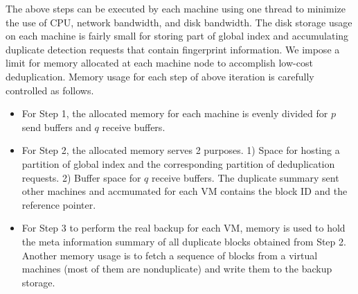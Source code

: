 The above steps can be executed by each machine
using one thread to minimize the use of CPU, network bandwidth, and disk bandwidth.
The  disk storage usage on each machine 
is fairly small for  storing part of global index and
accumulating  duplicate detection requests that contain fingerprint information.   
We impose a limit for memory allocated at each machine node to accomplish low-cost deduplication.  
Memory usage for each step of above iteration is carefully controlled as follows.
\begin{itemize}
\item For Step 1, the allocated memory for each machine is evenly divided for $p$ send buffers and $q$ receive buffers.

\item 
For Step 2,  the allocated memory serves 2 purposes. 1) Space for hosting a partition of global index and 
the corresponding partition of  deduplication requests. 2) Buffer space for $q$ receive buffers.
The duplicate summary sent other machines and accmumated for each VM contains
the block ID and  the reference pointer.   

\item For Step 3 to  perform the real backup for each VM, 
memory is used to hold the meta information summary of all duplicate blocks obtained  from Step 2. 
Another memory usage is to fetch a sequence of blocks from a virtual machines (most of them are nonduplicate) 
and write them to the  backup storage.

\end{itemize}

